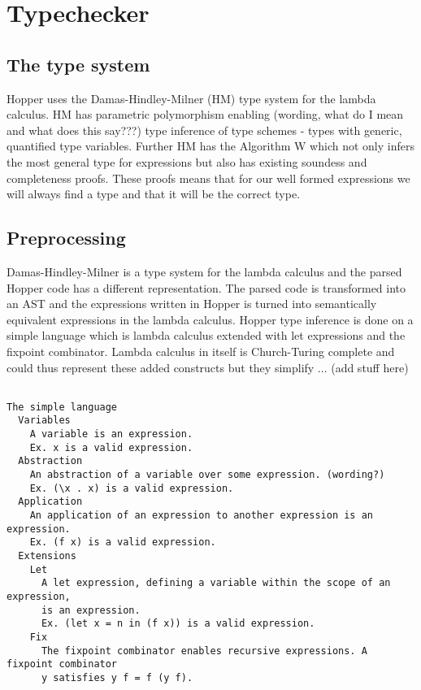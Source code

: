 \section{Typechecker}

\subsection{The type system}

Hopper uses the Damas-Hindley-Milner (HM) type system for the lambda calculus. HM has parametric polymorphism enabling (wording, what do I mean and what does this say???) type inference of type schemes - types with generic, quantified type variables. Further HM has the Algorithm W which not only infers the most general type for expressions but also has existing soundess and completeness proofs. These proofs means that for our well formed expressions we will always find a type and that it will be the correct type.

\subsection{Preprocessing}

Damas-Hindley-Milner is a type system for the lambda calculus and the parsed Hopper code has a different representation. The parsed code is transformed into an AST and the expressions written in Hopper is turned into semantically equivalent expressions in the lambda calculus. Hopper type inference is done on a simple language which is lambda calculus extended with let expressions and the fixpoint combinator. Lambda calculus in itself is Church-Turing complete and could thus represent these added constructs but they simplify ... (add stuff here)
\begin{verbatim}

The simple language
  Variables
    A variable is an expression.
    Ex. x is a valid expression.
  Abstraction
    An abstraction of a variable over some expression. (wording?)
    Ex. (\x . x) is a valid expression.
  Application
    An application of an expression to another expression is an expression.
    Ex. (f x) is a valid expression.
  Extensions
    Let
      A let expression, defining a variable within the scope of an expression,
      is an expression.
      Ex. (let x = n in (f x)) is a valid expression. 
    Fix
      The fixpoint combinator enables recursive expressions. A fixpoint combinator
      y satisfies y f = f (y f).

\end{verbatim}

